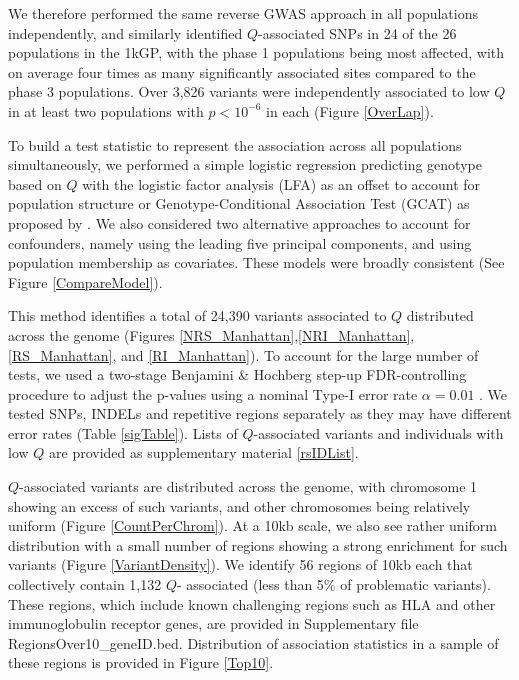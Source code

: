 \documentclass[9pt,lineno]{elife}
\begin{document}
We therefore performed the same reverse GWAS approach in all populations independently, and similarly identified $Q$-associated SNPs in 24 of the 26 populations in the 1kGP, with the phase 1 populations being most affected, with on average four times as many significantly associated sites compared to the phase 3 populations.
Over 3,826 variants were independently associated to low $Q$ in at least two populations with $ p < 10^{-6}$ in each (Figure \ref{OverLap}).

To build a test statistic to represent the association across all populations simultaneously, we performed a simple logistic regression predicting genotype based on $Q$ with the logistic factor analysis (LFA) as an offset to account for population structure or Genotype-Conditional Association Test  (GCAT) as proposed by \citep{song2015testing}. 
We also considered two alternative approaches to account for confounders, namely using the leading five  principal components, and using population membership as covariates. 
These models were broadly consistent (See Figure \ref{CompareModel}).

This method identifies a total of 24,390 variants associated to $Q$ distributed across the genome (Figures \ref{NRS_Manhattan},\ref{NRI_Manhattan}, \ref{RS_Manhattan}, and \ref{RI_Manhattan}). 
To account for the large number of tests, we used a two-stage Benjamini \& Hochberg step-up FDR-controlling procedure to adjust the p-values using a nominal Type-I error rate $\alpha = 0.01$ \citep{Benjamini2006}. 
We tested SNPs, INDELs and repetitive regions separately as they may have different error rates (Table \ref{sigTable}).
Lists of $Q$-associated variants and individuals with low $Q$ are provided as supplementary material \ref{rsIDList}.

$Q$-associated variants are distributed across the genome, with chromosome 1 showing an excess of such variants, and other chromosomes being relatively uniform (Figure \ref{CountPerChrom}).
At a 10kb scale, we also see rather uniform distribution with a small number of regions showing a strong enrichment for such variants (Figure \ref{VariantDensity}). We identify 56 regions of 10kb each that collectively contain 1,132 $Q$- associated (less than 5\% of problematic variants). These regions, which include known challenging regions such as HLA and other immunoglobulin receptor genes, are provided in Supplementary file RegionsOver10\_geneID.bed. Distribution of association statistics in a sample of these regions is provided in Figure \ref{Top10}.
\end{document}
